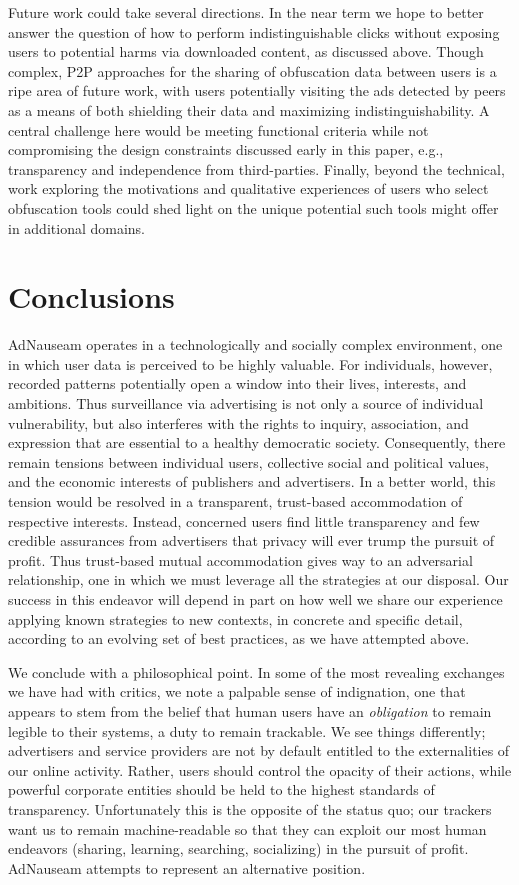 \documentclass[conference]{IEEEtran}
\begin{document}
Future work could take several directions. In the near term we hope to better answer the question of how to perform indistinguishable clicks without exposing users to potential harms via downloaded content, as discussed above. Though complex, P2P approaches for the sharing of obfuscation data between users is a ripe area of future work, with users potentially visiting the ads detected by peers as a means of both shielding their data and maximizing indistinguishability. A central challenge here would be meeting functional criteria while not compromising the design constraints discussed early in this paper, e.g., transparency and independence from third-parties. Finally, beyond the technical, work exploring the motivations and qualitative experiences of users who select obfuscation tools could shed light on the unique potential such tools might offer in additional domains.


\section{Conclusions}

AdNauseam operates in a technologically and socially complex environment, one in which user data is perceived to be highly valuable. For individuals, however, recorded patterns potentially open a window into their lives, interests, and ambitions. Thus surveillance via advertising is not only a source of individual vulnerability, but also interferes with the rights to inquiry, association, and expression that are essential to a healthy democratic society. Consequently, there remain tensions between individual users, collective social and political values, and the economic interests of publishers and advertisers. In a better world, this tension would be resolved in a transparent, trust-based accommodation of respective interests. Instead, concerned users find little transparency and few credible assurances from advertisers that privacy will ever trump the pursuit of profit. Thus trust-based mutual accommodation gives way to an adversarial relationship, one in which we must leverage all the strategies at our disposal. Our success in this endeavor will depend in part on how well we share our experience applying known strategies to new contexts, in concrete and specific detail, according to an evolving set of best practices, as we have attempted above.

We conclude with a philosophical point. In some of the most revealing exchanges we have had with critics, we note a palpable sense of indignation, one that appears to stem from the belief that human users have an \emph{obligation} to remain legible to their systems, a duty to remain trackable. We see things differently; advertisers and service providers are not by default entitled to the externalities of our online activity. Rather, users should control the opacity of their actions, while powerful corporate entities should be held to the highest standards of transparency. Unfortunately this is the opposite of the status quo; our trackers want us to remain machine-readable so that they can exploit our most human endeavors (sharing, learning, searching, socializing) in the pursuit of profit. AdNauseam attempts to represent an alternative position.
\end{document}
